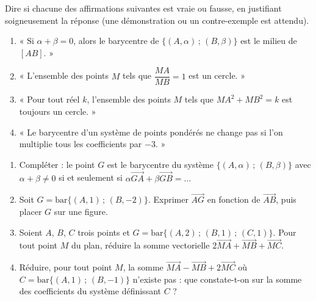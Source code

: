\documentclass[11pt]{article}
\begin{document}
\begin{exercice}
Dire si chacune des affirmations suivantes est vraie ou fausse, en justifiant soigneusement la réponse (une démonstration ou un contre-exemple est attendu).
\begin{enumerate}
\item « Si $\alpha + \beta = 0$, alors le barycentre de $\{(A,\alpha)\,;\,(B,\beta)\}$ est le milieu de $[AB]$. »
\item « L'ensemble des points $M$ tels que $\dfrac{MA}{MB} = 1$ est un cercle. »
\item « Pour tout réel $k$, l'ensemble des points $M$ tels que $MA^2 + MB^2 = k$ est toujours un cercle. »
\item « Le barycentre d'un système de points pondérés ne change pas si l'on multiplie tous les coefficients par $-3$. »
\end{enumerate}
\end{exercice}

\begin{exercice}
\begin{enumerate}
\item Compléter : le point $G$ est le barycentre du système $\{(A,\alpha)\,;\,(B,\beta)\}$ avec $\alpha + \beta \neq 0$ si et seulement si $\alpha\overrightarrow{GA} + \beta\overrightarrow{GB} = \ldots$
\item Soit $G = \mathrm{bar}\{(A,1)\,;\,(B,-2)\}$. Exprimer $\overrightarrow{AG}$ en fonction de $\overrightarrow{AB}$, puis placer $G$ sur une figure.
\item Soient $A$, $B$, $C$ trois points et $G = \mathrm{bar}\{(A,2)\,;\,(B,1)\,;\,(C,1)\}$. Pour tout point $M$ du plan, réduire la somme vectorielle $2\overrightarrow{MA} + \overrightarrow{MB} + \overrightarrow{MC}$.
\item Réduire, pour tout point $M$, la somme $\overrightarrow{MA} - \overrightarrow{MB} + 2\overrightarrow{MC}$ où $C = \mathrm{bar}\{(A,1)\,;\,(B,-1)\}$ n'existe pas : que constate-t-on sur la somme des coefficients du système définissant $C$ ?
\end{enumerate}
\end{exercice}
\end{document}
